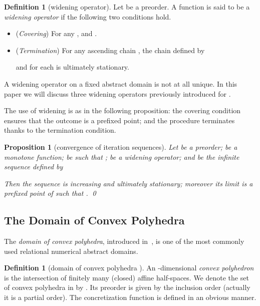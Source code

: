 \documentclass[envcountsect,orivec]{llncs} \pdfoutput=1
\newtheorem{myprop}[mythm]{Proposition}
\theoremstyle{definition}
\newtheorem{mydef}[mythm]{Definition}
\def\myqed{\qed}
\begin{document}
\begin{mydef}[widening operator]\label{def:widen}
 Let  be a preorder.
 A function  is said to be a \emph{widening operator} if the following two conditions hold.
 \begin{itemize}
  \item (\emph{Covering}) For any ,  and .
  \item (\emph{Termination}) For any ascending chain , the chain  defined by

	 and
 for each 
is ultimately stationary.
 \end{itemize}
\end{mydef}
\noindent  A widening operator on a fixed abstract domain 
is not at all unique.  In this paper we will discuss three widening operators previously introduced for .

 The use of widening is as in the following proposition: the covering
 condition  ensures that the outcome is a prefixed point; and the
 procedure terminates thanks to the
 termination condition.
\begin{myprop}[convergence of iteration sequences]\label{prop:widen}
 Let  be a preorder;  be a monotone function;  be such that ;  be a widening operator; and  be the infinite sequence defined by
 
Then the sequence  is increasing and
 ultimately
 stationary; moreover its limit  is a prefixed
 point of  such that .
\myqed
\end{myprop}












\subsection{The Domain of Convex Polyhedra}\label{subsec:convexpoly}
The \emph{domain of convex polyhedra}, introduced in~\cite{Cousot1978},
is one of the most commonly used relational numerical abstract domains.
\begin{mydef}[domain of convex polyhedra ]\label{def:convexPoly}
An -dimensional \emph{convex polyhedron} is the intersection of
 finitely many (closed) affine half-spaces.
We denote the set of convex polyhedra in  by .
Its preorder   is given by the inclusion order (actually it is a partial order).
The concretization function  is defined in an obvious manner.
\end{mydef}
\end{document}
